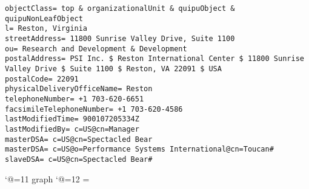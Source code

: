 
\tiny
\begin{verbatim}
objectClass= top & organizationalUnit & quipuObject & quipuNonLeafObject
l= Reston, Virginia
streetAddress= 11800 Sunrise Valley Drive, Suite 1100
ou= Research and Development & Development
postalAddress= PSI Inc. $ Reston International Center $ 11800 Sunrise Valley Drive $ Suite 1100 $ Reston, VA 22091 $ USA
postalCode= 22091
physicalDeliveryOfficeName= Reston
telephoneNumber= +1 703-620-6651
facsimileTelephoneNumber= +1 703-620-4586
lastModifiedTime= 900107205334Z
lastModifiedBy= c=US@cn=Manager
masterDSA= c=US@cn=Spectacled Bear
masterDSA= c=US@o=Performance Systems International@cn=Toucan#
slaveDSA= c=US@cn=Spectacled Bear#

\end{verbatim}

\catcode`@=11
\expandafter\ifx\csname graph\endcsname\relax {}\box\chardef\insc@unt\graph\fi
\catcode`@=12
\setbox\graph=\empty
